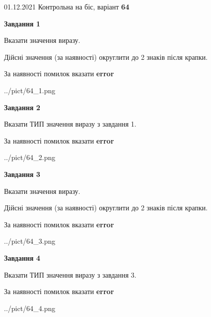 \documentclass[11pt, ukrainian]{article}
\begin{document}
{01.12.2021 Контрольна на біс, варіант  \No \textbf { 64 }\par}
{
\begin {large}
{\begin {center}\textbf{Завдання 1}\end {center}}\par
Вказати значення виразу. \par
Дійсні значення (за наявності) округлити до 2 знаків після крапки. \par
За наявності помилок вказати \textbf{error}

\begin{center}
	{../pict/64_1.png}
\end{center}
\newpage

{\begin {center}\textbf{Завдання 2}\end {center}}\par
Вказати ТИП значення виразу з завдання 1. \par
За наявності помилок вказати \textbf{error}

\begin{center}
	{../pict/64_2.png}
\end{center}
\newpage

{\begin {center}\textbf{Завдання 3}\end {center}}\par
Вказати значення виразу. \par
Дійсні значення (за наявності) округлити до 2 знаків після крапки. \par
За наявності помилок вказати \textbf{error}

\begin{center}
	{../pict/64_3.png}
\end{center}
\newpage

{\begin {center}\textbf{Завдання 4}\end {center}}\par
Вказати ТИП значення виразу з завдання 3. \par
За наявності помилок вказати \textbf{error}

\begin{center}
	{../pict/64_4.png}
\end{center}
\newpage


\end{large}}
\end{document}
